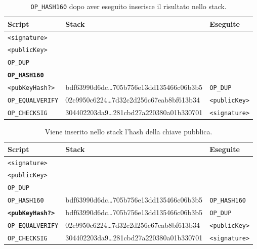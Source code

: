 \begin{table}[H]
    \centering
    \begin{tabular}{p{3cm}|p{7.7cm}|p{3cm}}
        Script & Stack & Eseguite\\
        \hline
        \texttt{<signature>}            & &\\
        \texttt{<publicKey>}            & &\\
        \texttt{OP\_DUP}                & &\\
        \texttt{\textbf{OP\_HASH160}}   & &\\
        \texttt{<pubKeyHash?>}          & bdf63990d6dc\dots705b756e13dd135466c06b3b5 & \texttt{OP\_DUP}\\
        \texttt{OP\_EQUALVERIFY}        & 02c9950c6224\dots7d32c2d256c67eab8bf613b34 & \texttt{<publicKey>}\\
        \texttt{OP\_CHECKSIG}           & 304402203da9\dots281cbd27a220380a01b330701 & \texttt{<signature>}\\
    \end{tabular}
    \caption{\texttt{OP\_HASH160} dopo aver eseguito inserisce il risultato nello stack.}
\end{table}

\begin{table}[H]
    \centering
    \begin{tabular}{p{3cm}|p{7.7cm}|p{3cm}}
        Script & Stack & Eseguite\\
        \hline
        \texttt{<signature>}            & &\\
        \texttt{<publicKey>}            & &\\
        \texttt{OP\_DUP}                & &\\
        \texttt{OP\_HASH160}            & bdf63990d6dc\dots705b756e13dd135466c06b3b5 & \texttt{OP\_HASH160}\\
        \texttt{\textbf{<pubKeyHash?>}} & bdf63990d6dc\dots705b756e13dd135466c06b3b5 & \texttt{OP\_DUP}\\
        \texttt{OP\_EQUALVERIFY}        & 02c9950c6224\dots7d32c2d256c67eab8bf613b34 & \texttt{<publicKey>}\\
        \texttt{OP\_CHECKSIG}           & 304402203da9\dots281cbd27a220380a01b330701 & \texttt{<signature>}\\
    \end{tabular}
    \caption{Viene inserito nello stack l'hash della chiave pubblica.}
\end{table}


